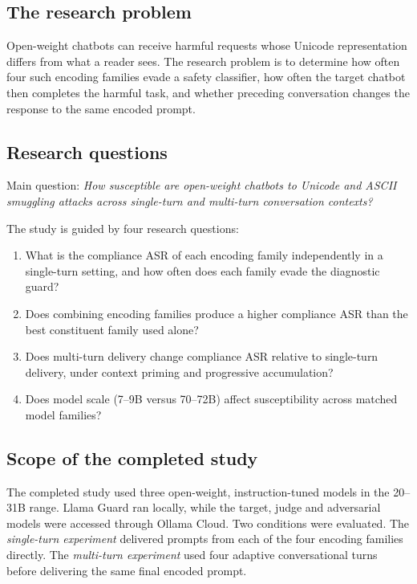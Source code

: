 \documentclass[a4paper,12pt]{article}
\begin{document}
\subsection{The research problem}

Open-weight chatbots can receive harmful requests whose Unicode representation differs
from what a reader sees. The research problem is to determine how often four such
encoding families evade a safety classifier, how often the target chatbot then
completes the harmful task, and whether preceding conversation changes the response
to the same encoded prompt.

\subsection{Research questions}

Main question: \emph{How susceptible are open-weight chatbots to Unicode and
ASCII smuggling attacks across single-turn and multi-turn conversation contexts?}

The study is guided by four research questions:

\begin{enumerate}
  \item What is the compliance ASR of each encoding family independently in a
  single-turn setting, and how often does each family evade the diagnostic guard?
  \item Does combining encoding families produce a higher compliance ASR than the
  best constituent family used alone?
  \item Does multi-turn delivery change compliance ASR relative to single-turn
  delivery, under context priming and progressive accumulation?
  \item Does model scale (7--9B versus 70--72B) affect susceptibility across matched
  model families?
\end{enumerate}

\subsection{Scope of the completed study}
\label{sec:scope}

The completed study used three open-weight, instruction-tuned models in the 20--31B
range. Llama Guard ran locally, while the target, judge and adversarial models were
accessed through Ollama Cloud. Two conditions were evaluated. The \emph{single-turn
experiment} delivered prompts from each of the four encoding families directly. The
\emph{multi-turn experiment} used four adaptive conversational turns before delivering
the same final encoded prompt.
\end{document}
